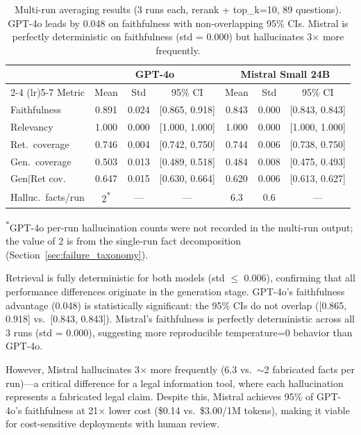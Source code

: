 \documentclass{article}
\begin{document}
\begin{table}[t]
  \caption{Multi-run averaging results (3 runs each, rerank + top\_k=10, 89 questions). GPT-4o leads by 0.048 on faithfulness with non-overlapping 95\% CIs. Mistral is perfectly deterministic on faithfulness (std = 0.000) but hallucinates 3$\times$ more frequently.}
  \label{tab:multirun}
  \centering
  \small
  \begin{tabular}{lcccccc}
    \toprule
    & \multicolumn{3}{c}{GPT-4o} & \multicolumn{3}{c}{Mistral Small 24B} \\
    \cmidrule(lr){2-4} \cmidrule(lr){5-7}
    Metric & Mean & Std & 95\% CI & Mean & Std & 95\% CI \\
    \midrule
    Faithfulness & 0.891 & 0.024 & [0.865, 0.918] & 0.843 & 0.000 & [0.843, 0.843] \\
    Relevancy & 1.000 & 0.000 & [1.000, 1.000] & 1.000 & 0.000 & [1.000, 1.000] \\
    Ret.\ coverage & 0.746 & 0.004 & [0.742, 0.750] & 0.744 & 0.006 & [0.738, 0.750] \\
    Gen.\ coverage & 0.503 & 0.013 & [0.489, 0.518] & 0.484 & 0.008 & [0.475, 0.493] \\
    Gen$|$Ret cov.\ & 0.647 & 0.015 & [0.630, 0.664] & 0.620 & 0.006 & [0.613, 0.627] \\
    Halluc.\ facts/run & 2\textsuperscript{*} & --- & --- & 6.3 & 0.6 & --- \\
    \bottomrule
  \end{tabular}
\end{table}

\noindent\textsuperscript{*}GPT-4o per-run hallucination counts were not recorded in the multi-run output; the value of 2 is from the single-run fact decomposition (Section~\ref{sec:failure_taxonomy}).

Retrieval is fully deterministic for both models (std $\leq$ 0.006), confirming that all performance differences originate in the generation stage. GPT-4o's faithfulness advantage (0.048) is statistically significant: the 95\% CIs do not overlap ([0.865, 0.918] vs.\ [0.843, 0.843]). Mistral's faithfulness is perfectly deterministic across all 3 runs (std = 0.000), suggesting more reproducible temperature=0 behavior than GPT-4o.

However, Mistral hallucinates 3$\times$ more frequently (6.3 vs.\ $\sim$2 fabricated facts per run)---a critical difference for a legal information tool, where each hallucination represents a fabricated legal claim. Despite this, Mistral achieves 95\% of GPT-4o's faithfulness at 21$\times$ lower cost (\$0.14 vs.\ \$3.00/1M tokens), making it viable for cost-sensitive deployments with human review.
\end{document}

